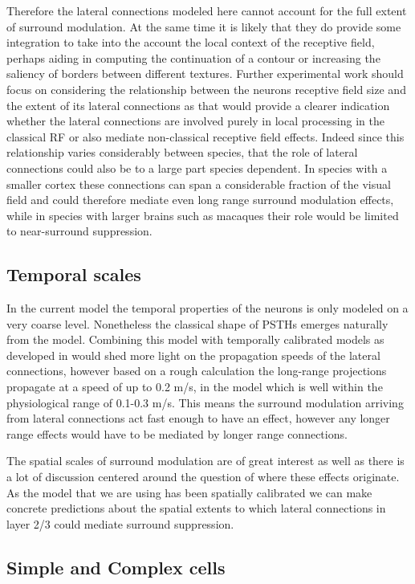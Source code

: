 Therefore the lateral connections modeled here cannot account for the
full extent of surround modulation. At the same time it is likely that
they do provide some integration to take into the account the local
context of the receptive field, perhaps aiding in computing the
continuation of a contour or increasing the saliency of borders
between different textures. Further experimental work should focus on
considering the relationship between the neurons receptive field size
and the extent of its lateral connections as that would provide a
clearer indication whether the lateral connections are involved purely
in local processing in the classical RF or also mediate non-classical
receptive field effects. Indeed since this relationship varies
considerably between species, that the role of lateral connections
could also be to a large part species dependent. In species with a
smaller cortex these connections can span a considerable fraction of
the visual field and could therefore mediate even long range surround
modulation effects, while in species with larger brains such as
macaques their role would be limited to near-surround suppression.

\subsection{Temporal scales}

In the current model the temporal properties of the neurons is only
modeled on a very coarse level. Nonetheless the classical shape of
PSTHs emerges naturally from the model. Combining this model with
temporally calibrated models as developed in \citep{StevensPhD2016}
would shed more light on the propagation speeds of the lateral
connections, however based on a rough calculation the long-range
projections propagate at a speed of up to 0.2 m/s, in the model which
is well within the physiological range of 0.1-0.3 m/s. This means the
surround modulation arriving from lateral connections act fast enough
to have an effect, however any longer range effects would have to be
mediated by longer range connections.

The spatial scales of surround modulation are of great interest as
well as there is a lot of discussion centered around the question of
where these effects originate. As the model that we are using has been
spatially calibrated we can make concrete predictions about the
spatial extents to which lateral connections in layer 2/3 could
mediate surround suppression.

\subsection{Simple and Complex cells}

